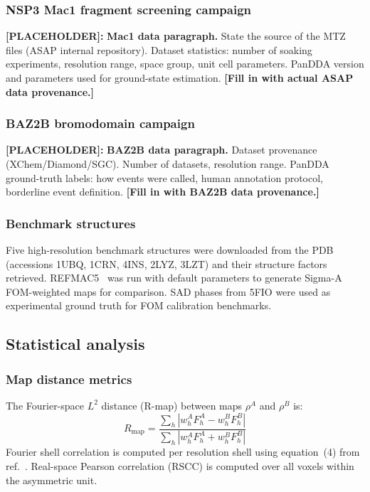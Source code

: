 \documentclass[10pt,twocolumn]{article}
\newcommand{\placeholder}[1]{%
  \begin{mdframed}[
    linecolor=placeholder,linewidth=1pt,
    backgroundcolor=red!5,
    innertopmargin=6pt,innerbottommargin=6pt,
    innerleftmargin=8pt,innerrightmargin=8pt]
  \small\color{placeholder}\textbf{[PLACEHOLDER]:} #1
  \end{mdframed}
}
\begin{document}
\subsubsection{NSP3 Mac1 fragment screening campaign}

\placeholder{
\textbf{Mac1 data paragraph.}
State the source of the MTZ files (ASAP internal repository).
Dataset statistics: number of soaking experiments, resolution
range, space group, unit cell parameters.
PanDDA version and parameters used for ground-state estimation.
\textbf{[Fill in with actual ASAP data provenance.]}
}

\subsubsection{BAZ2B bromodomain campaign}

\placeholder{
\textbf{BAZ2B data paragraph.}
Dataset provenance (XChem/Diamond/SGC).
Number of datasets, resolution range.
PanDDA ground-truth labels: how events were called, human
annotation protocol, borderline event definition.
\textbf{[Fill in with BAZ2B data provenance.]}
}

\subsubsection{Benchmark structures}

Five high-resolution benchmark structures were downloaded from the
PDB (accessions 1UBQ, 1CRN, 4INS, 2LYZ, 3LZT) and their
structure factors retrieved.
REFMAC5~\cite{murshudov1997} was run with default parameters to
generate Sigma-A FOM-weighted maps for comparison.
SAD phases from 5FIO were used as experimental ground truth for
FOM calibration benchmarks.

\subsection{Statistical analysis}

\subsubsection{Map distance metrics}

The Fourier-space $L^2$ distance (R-map) between maps
$\rho^A$ and $\rho^B$ is:
\begin{equation}
  R_{\mathrm{map}} = \frac{\sum_h|w^A_h F^A_h - w^B_h F^B_h|}
    {\sum_h|w^A_h F^A_h + w^B_h F^B_h|}
  \label{eq:rmap}
\end{equation}
Fourier shell correlation is computed per resolution shell using
equation~(4) from ref.~\cite{nakane2020}.
Real-space Pearson correlation (RSCC) is computed over all
voxels within the asymmetric unit.
\end{document}
